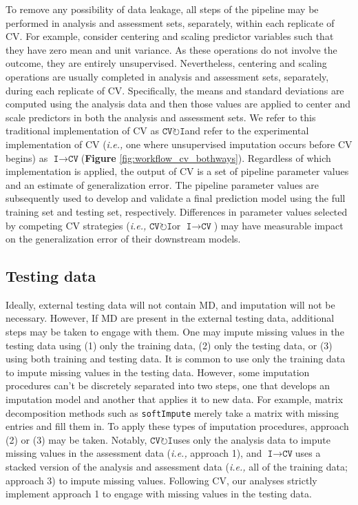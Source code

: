 \documentclass[AMA,STIX1COL,doublespace]{WileyNJD-v2}
\begin{document}
To remove any possibility of data leakage, all steps of the pipeline may
be performed in analysis and assessment sets, separately, within each
replicate of CV. For example, consider centering and scaling predictor
variables such that they have zero mean and unit variance. As these
operations do not involve the outcome, they are entirely unsupervised.
Nevertheless, centering and scaling operations are usually completed in
analysis and assessment sets, separately, during each replicate of CV.
Specifically, the means and standard deviations are computed using the
analysis data and then those values are applied to center and scale
predictors in both the analysis and assessment sets. We refer to this
traditional implementation of CV as
$\texttt{CV}\!\circlearrowright\!\texttt{I}$\space and refer to the
experimental implementation of CV (\textit{i.e., }one where unsupervised
imputation occurs before CV begins) as
$\texttt{I}\!\!\rightarrow\!\texttt{CV}$\space (\textbf{Figure}
\ref{fig:workflow_cv_bothways}). Regardless of which implementation is
applied, the output of CV is a set of pipeline parameter values and an
estimate of generalization error. The pipeline parameter values are
subsequently used to develop and validate a final prediction model using
the full training set and testing set, respectively. Differences in
parameter values selected by competing CV strategies
(\textit{i.e., }$\texttt{CV}\!\circlearrowright\!\texttt{I}$\space or
$\texttt{I}\!\!\rightarrow\!\texttt{CV}$) may have measurable impact on
the generalization error of their downstream models.

\subsection{Testing data} \label{subsec:testing_data}

Ideally, external testing data will not contain MD, and imputation will
not be necessary. However, If MD are present in the external testing
data, additional steps may be taken to engage with them. One may impute
missing values in the testing data using (1) only the training data, (2)
only the testing data, or (3) using both training and testing data. It
is common to use only the training data to impute missing values in the
testing data. However, some imputation procedures can't be discretely
separated into two steps, one that develops an imputation model and
another that applies it to new data. For example, matrix decomposition
methods such as \texttt{softImpute} merely take a matrix with missing
entries and fill them in.\citep{softImpute} To apply these types of
imputation procedures, approach (2) or (3) may be taken. Notably,
$\texttt{CV}\!\circlearrowright\!\texttt{I}$\space uses only the
analysis data to impute missing values in the assessment data
(\textit{i.e., }approach 1), and
$\texttt{I}\!\!\rightarrow\!\texttt{CV}$\space uses a stacked version of
the analysis and assessment data (\textit{i.e., }all of the training
data; approach 3) to impute missing values. Following CV, our analyses
strictly implement approach 1 to engage with missing values in the
testing data.
\end{document}
